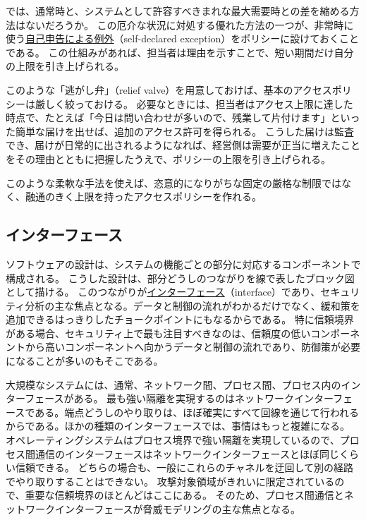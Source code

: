 \documentclass[uplatex]{jsarticle}
\def\label#1{}%
\begin{document}
では、通常時と、システムとして許容すべきまれな最大需要時との差を縮める方法はないだろうか。
この厄介な状況に対処する優れた方法の一つが、非常時に使う\underline{自己申告による例外}（self-declared exception）をポリシーに設けておくことである。
この仕組みがあれば、担当者は理由を示すことで、短い期間だけ自分の上限を引き上げられる。

\begin{exa}\label{exa:ch3-relief-valve}
このような「逃がし弁」（relief valve）を用意しておけば、基本のアクセスポリシーは厳しく絞っておける。
必要なときには、担当者はアクセス上限に達した時点で、たとえば「今日は問い合わせが多いので、残業して片付けます」といった簡単な届けを出せば、追加のアクセス許可を得られる。
こうした届けは監査でき、届けが日常的に出されるようになれば、経営側は需要が正当に増えたことをその理由とともに把握したうえで、ポリシーの上限を引き上げられる。
\end{exa}

このような柔軟な手法を使えば、恣意的になりがちな固定の厳格な制限ではなく、融通のきく上限を持ったアクセスポリシーを作れる。

\subsection{インターフェース}\label{subsec:ch3-interfaces}

ソフトウェアの設計は、システムの機能ごとの部分に対応するコンポーネントで構成される。
こうした設計は、部分どうしのつながりを線で表したブロック図として描ける。
このつながりが\underline{インターフェース}（interface）であり、セキュリティ分析の主な焦点となる。データと制御の流れがわかるだけでなく、緩和策を追加できるはっきりしたチョークポイントにもなるからである。
特に信頼境界がある場合、セキュリティ上で最も注目すべきなのは、信頼度の低いコンポーネントから高いコンポーネントへ向かうデータと制御の流れであり、防御策が必要になることが多いのもそこである。

大規模なシステムには、通常、ネットワーク間、プロセス間、プロセス内のインターフェースがある。
最も強い隔離を実現するのはネットワークインターフェースである。端点どうしのやり取りは、ほぼ確実にすべて回線を通じて行われるからである。ほかの種類のインターフェースでは、事情はもっと複雑になる。
オペレーティングシステムはプロセス境界で強い隔離を実現しているので、プロセス間通信のインターフェースはネットワークインターフェースとほぼ同じくらい信頼できる。
どちらの場合も、一般にこれらのチャネルを迂回して別の経路でやり取りすることはできない。
攻撃対象領域がきれいに限定されているので、重要な信頼境界のほとんどはここにある。
そのため、プロセス間通信とネットワークインターフェースが脅威モデリングの主な焦点となる。
\end{document}
